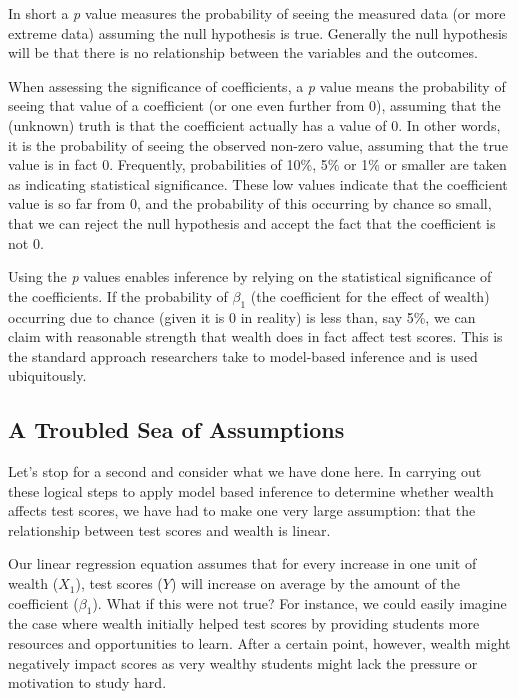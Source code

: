 \documentclass[]{memoir}
\begin{document}
In short a \emph{p} value measures the probability of seeing the
measured data (or more extreme data) assuming the null hypothesis is
true. Generally the null hypothesis will be that there is no
relationship between the variables and the outcomes.

When assessing the significance of coefficients, a \emph{p} value means
the probability of seeing that value of a coefficient (or one even
further from 0), assuming that the (unknown) truth is that the
coefficient actually has a value of 0. In other words, it is the
probability of seeing the observed non-zero value, assuming that the
true value is in fact 0. Frequently, probabilities of 10\%, 5\% or 1\%
or smaller are taken as indicating statistical significance. These low
values indicate that the coefficient value is so far from 0, and the
probability of this occurring by chance so small, that we can reject the
null hypothesis and accept the fact that the coefficient is not 0.

Using the \emph{p} values enables inference by relying on the
statistical significance of the coefficients. If the probability of
$\beta_1$ (the coefficient for the effect of wealth) occurring due to
chance (given it is 0 in reality) is less than, say 5\%, we can claim
with reasonable strength that wealth does in fact affect test scores.
This is the standard approach researchers take to model-based inference
and is used ubiquitously.

\subsection{A Troubled Sea of Assumptions}

Let's stop for a second and consider what we have done here. In carrying
out these logical steps to apply model based inference to determine
whether wealth affects test scores, we have had to make one very large
assumption: that the relationship between test scores and wealth is
linear.

Our linear regression equation assumes that for every increase in one
unit of wealth ($X_1$), test scores ($Y$) will increase on average by
the amount of the coefficient ($\beta_1$). What if this were not true?
For instance, we could easily imagine the case where wealth initially
helped test scores by providing students more resources and
opportunities to learn. After a certain point, however, wealth might
negatively impact scores as very wealthy students might lack the
pressure or motivation to study hard.
\end{document}
